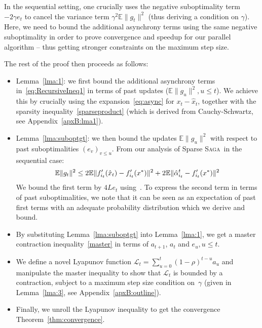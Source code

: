 \documentclass[twoside]{article}
\newcommand{\stepsize}{\gamma}
\newcommand{\contraction}{\rho}
\newcommand{\lyapunov}{\mathcal{L}}
\newcommand{\E}{\mathbb{E}}
\newcommand{\SAGA}{\textsc{Saga}}
\begin{document}
In the sequential setting, one crucially uses the negative suboptimality term $-2\stepsize e_t$ to cancel the variance term $\stepsize^2 \E \|g_t\|^2$ (thus deriving a condition on $\stepsize$).
Here, we need to bound the additional asynchrony terms using the same negative suboptimality in order to prove convergence and speedup for our parallel algorithm -- thus getting stronger constraints on the maximum step size.

The rest of the proof then proceeds as follows:
\vspace{-2mm}
\begin{itemize}[leftmargin=1.5em, topsep=1mm, itemsep=0mm]
	\item Lemma~\ref{lma:1}: we first bound the additional asynchrony terms in~\eqref{eq:RecursiveIneq1} in terms of past updates ($\E \|g_u\|^2, u\leq t$). 
	We achieve this by crucially using the expansion~\eqref{eq:async} for $x_t - \hat{x}_t$, together with the sparsity inequality~\eqref{sparseproduct} (which is derived from Cauchy-Schwartz, see Appendix~\ref{apxB:lma1}).
	
	\item Lemma~\ref{lma:suboptgt}: we then bound the updates $\E \|g_u\|^2$ with respect to past suboptimalities $(e_v)_{v\leq u}$. From our analysis of Sparse \SAGA\ in the sequential case:
	\begin{equation}
	\E\|g_t\|\sp{2} 
	\leq 2 \E \|f'_{i_t}(\hat x_t)-f'_{i_t}(x\sp{*})\|^2 
	+ 2 \E \|\hat \alpha_{i_t}\sp{t} - f'_{i_t}(x\sp{*})\|^2 \notag
	\end{equation}
	We bound the first term by $4Le_t$ using~\citet[Equation (8)]{qsaga}.
	To express the second term in terms of past suboptimalities, we note that it can be seen as an expectation of past first terms with an adequate probability distribution which we derive and bound.
	
	\item By substituting Lemma~\ref{lma:suboptgt} into Lemma~\ref{lma:1}, we get a master contraction inequality~\eqref{master} in terms of $a_{t+1}$, $a_t$ and $e_u, u\leq t$.
	
	\item We define a novel Lyapunov function $\lyapunov_t = \sum_{u=0}^t (1-\contraction)^{t-u}a_u$ and manipulate the master inequality to show that $\lyapunov_t$ is bounded by a contraction, subject to a maximum step size condition on~$\stepsize$ (given in Lemma~\ref{lma:3}, see Appendix~\ref{apxB:outline}).
	
	\item Finally, we unroll the Lyapunov inequality to get the convergence Theorem~\ref{thm:convergence}.
\end{itemize}
\end{document}
